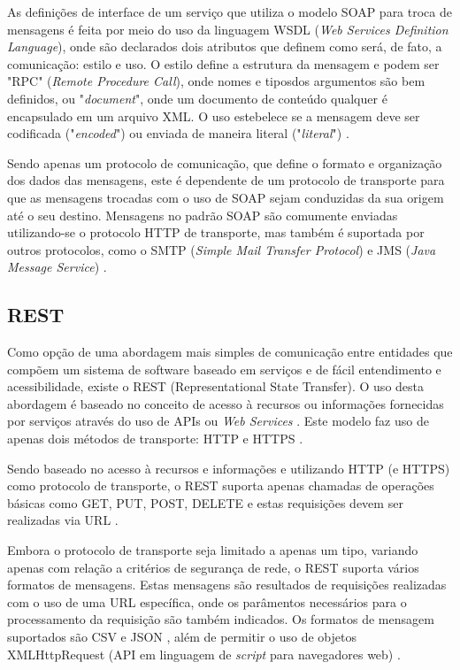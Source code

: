As definições de interface de um serviço que utiliza o modelo SOAP para troca de mensagens é feita por meio do uso da linguagem WSDL (\textit{Web Services Definition Language}), onde são declarados dois atributos que definem como será, de fato, a comunicação: estilo e uso. O estilo define a estrutura da mensagem e podem ser "RPC" (\textit{Remote Procedure Call}), onde nomes e tiposdos argumentos são bem definidos, ou "\textit{document}", onde um documento de conteúdo qualquer é encapsulado em um arquivo XML. O uso estebelece se a mensagem deve ser codificada ("\textit{encoded}") ou enviada de maneira literal ("\textit{literal}") \cite{Bianco2007}.

Sendo apenas um protocolo de comunicação, que define o formato e organização dos dados das mensagens, este é dependente de um protocolo de transporte para que as mensagens trocadas com o uso de SOAP sejam conduzidas da sua origem até o seu destino. Mensagens no padrão SOAP são comumente enviadas utilizando-se o protocolo HTTP de transporte, mas também é suportada por outros protocolos, como o SMTP (\textit{Simple Mail Transfer Protocol}) e JMS (\textit{Java Message Service}) \cite{mueller_understanding_2013}.

\subsection{REST}
Como opção de uma abordagem mais simples de comunicação entre entidades que compõem um sistema de software baseado em serviços e de fácil entendimento e acessibilidade, existe o REST (Representational State Transfer). O uso desta abordagem é baseado no conceito de acesso à recursos ou informações fornecidas por serviços através do uso de APIs ou \textit{Web Services} \cite{Bianco2007}. Este modelo faz uso de apenas dois métodos de transporte: HTTP e HTTPS \cite{rozlog_restesoap_2013}.

Sendo baseado no acesso à recursos e informações e utilizando HTTP (e HTTPS) como protocolo de transporte, o REST suporta apenas chamadas de operações básicas como GET, PUT, POST, DELETE e estas requisições devem ser realizadas via URL \cite{rozlog_restesoap_2013}.

Embora o protocolo de transporte seja limitado a apenas um tipo, variando apenas com relação a critérios de segurança de rede, o REST suporta vários formatos de mensagens. Estas mensagens são resultados de requisições realizadas com o uso de uma URL específica, onde os parâmentos necessários para o processamento da requisição são também indicados. Os formatos de mensagem suportados são CSV e JSON \cite{mueller_understanding_2013}, além de permitir o uso de objetos XMLHttpRequest (API em linguagem de \textit{script} para navegadores web) \cite{rozlog_restesoap_2013}.

